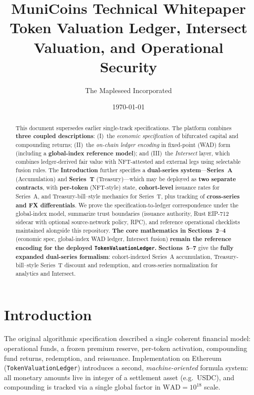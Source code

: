 \documentclass[11pt,a4paper]{article}
\title{MuniCoins Technical Whitepaper\\\large Token Valuation Ledger, Intersect Valuation, and Operational Security}
\author{The Mapleseed Incorporated}
\date{\today}
\newcommand{\WAD}{\mathrm{WAD}}
\newcommand{\minor}{\text{minor units}}
\begin{document}
\maketitle

\begin{abstract}
This document supersedes earlier single-track specifications. The platform combines
\textbf{three coupled descriptions}: (I)~the \emph{economic specification} of bifurcated capital and compounding returns;
(II)~the \emph{on-chain ledger encoding} in fixed-point (WAD) form (including a \textbf{global-index reference model});
and (III)~the \emph{Intersect} layer, which combines ledger-derived fair value with NFT-attested and external legs using selectable fusion rules. The \textbf{Introduction} further specifies a \textbf{dual-series system}---\textbf{Series~A} (Accumulation) and \textbf{Series~T} (Treasury)---which may be deployed as \textbf{two separate contracts}, with \textbf{per-token} (NFT-style) state, \textbf{cohort-level} issuance rates for Series~A, and Treasury-bill--style mechanics for Series~T, plus tracking of \textbf{cross-series and FX differentials}. We prove the
specification-to-ledger correspondence under the global-index model, summarize trust boundaries
(issuance authority, Rust EIP-712 sidecar with optional source-network policy, RPC), and reference operational checklists maintained alongside
this repository. \textbf{The core mathematics in Sections~2--4} (economic spec, global-index WAD ledger, Intersect fusion) \textbf{remain the reference encoding for the deployed \texttt{TokenValuationLedger}.} \textbf{Sections~5--7} give the \textbf{fully expanded dual-series formalism}: cohort-indexed Series~A accumulation, Treasury-bill--style Series~T discount and redemption, and cross-series normalization for analytics and Intersect.
\end{abstract}

\tableofcontents
\newpage

\section{Introduction}

The original algorithmic specification described a single coherent financial model: operational
funds, a frozen premium reserve, per-token activation, compounding fund returns, redemption, and
reissuance. Implementation on Ethereum (\texttt{TokenValuationLedger}) introduces a second,
\emph{machine-oriented} formula system: all monetary amounts live in integer \minor{} of a settlement
asset (e.g.\ USDC), and compounding is tracked via a single global factor in $\WAD=10^{18}$ scale.
\end{document}
